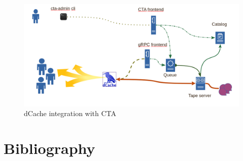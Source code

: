 \documentclass{webofc}
\begin{document}
\begin{figure}
    \centering
    \includegraphics[scale=0.25]{dcache-cta-integration.png}
    \caption{dCache integration with CTA}
    \label{fig:dcache_integration}
\end{figure}

\newpage
\section{Bibliography}
\label{refs}
\printbibliography
\end{document}
